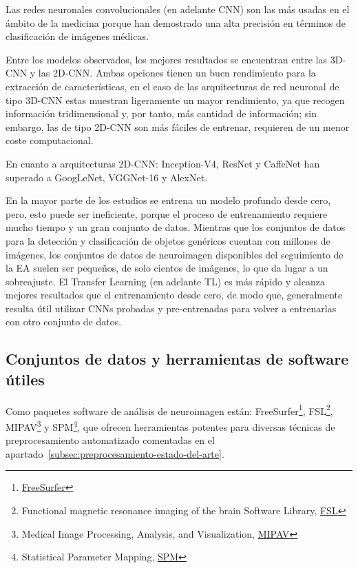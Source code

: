 Las redes neuronales convolucionales (en adelante CNN) son las más usadas en el ámbito de la medicina porque han
demostrado una alta precisión en términos de clasificación de imágenes médicas.

Entre los modelos observados, los mejores resultados se encuentran entre las 3D-CNN y las 2D-CNN. Ambas opciones tienen
un buen rendimiento para la extracción de características, en el caso de las arquitecturas de red neuronal de tipo
3D-CNN estas muestran ligeramente un mayor rendimiento, ya que recogen información tridimensional y, por tanto, más
cantidad de información;
sin embargo, las de tipo 2D-CNN son más fáciles de entrenar, requieren de un menor coste computacional.

En cuanto a arquitecturas 2D-CNN: Inception-V4, ResNet y CaffeNet han superado a GoogLeNet, VGGNet-16 y AlexNet.

En la mayor parte de los estudios se entrena un modelo profundo desde cero, pero, esto puede ser ineficiente, porque
el proceso de entrenamiento requiere mucho tiempo y un gran conjunto de datos.
Mientras que los conjuntos de datos para la detección y clasificación de objetos genéricos cuentan con millones de
imágenes, los conjuntos de datos de neuroimagen disponibles del seguimiento de la EA suelen ser pequeños, de solo
cientos de imágenes, lo que da lugar a un sobreajuste.
El Transfer Learning (en adelante TL) es más rápido y alcanza mejores resultados que el entrenamiento desde cero, de
modo que, generalmente resulta útil utilizar CNNs probadas y pre-entrenadas para volver a entrenarlas con otro conjunto
de datos.

\subsection{Conjuntos de datos y herramientas de software útiles}\label{subsec:datos-y-herramientas-estado-del-arte}
Como paquetes software de análisis de neuroimagen están:
FreeSurfer\footnote{\href{https://surfer.nmr.mgh.harvard.edu/}{FreeSurfer}},
FSL\footnote{Functional magnetic resonance imaging of the brain Software Library, \href{https://fsl.fmrib.ox.ac.uk/fsl/fslwiki/}{FSL}},
MIPAV\footnote{Medical Image Processing, Analysis, and Visualization, \href{https://mipav.cit.nih.gov/}{MIPAV}}
y SPM\footnote{Statistical Parameter Mapping, \href{https://www.fil.ion.ucl.ac.uk/spm/}{SPM}},
que ofrecen herramientas potentes para diversas técnicas de preprocesamiento automatizado comentadas en el
apartado~\ref{subsec:preprocesamiento-estado-del-arte}.

